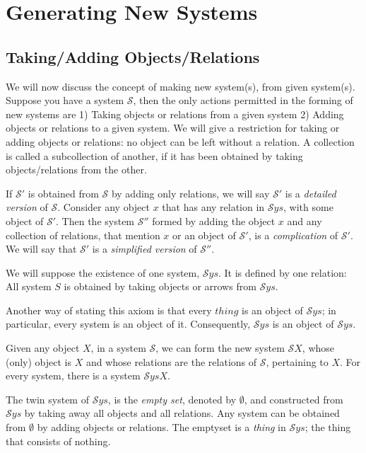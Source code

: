 \documentclass [12pt]{book}
\begin{document}
	\section{Generating New Systems}

		\subsection{Taking/Adding Objects/Relations}

We will now discuss the concept of making new system(s), from given system(s). Suppose you have a system $\mathcal{S}$, then the only actions permitted in the forming of new systems are 1) Taking objects or relations from a given system 2) Adding objects or relations to a given system. We will give a restriction for taking or adding objects or relations: no object can be left without a relation. A collection is called a subcollection of another, if it has been obtained by taking objects/relations from the other.

If $\mathcal{S}'$ is obtained from $\mathcal{S}$ by adding only relations, we will say $\mathcal{S}'$ is a \textit{detailed version} of $\mathcal{S}$. Consider any object $x$ that has any relation in $\mathcal{S}ys$, with some object of $\mathcal{S}'$. Then the system $\mathcal{S}''$ formed by adding the object $x$ and any collection of relations, that mention $x$ or an object of $\mathcal{S}'$, is a \textit{complication} of $\mathcal{S}'$. We will say that $\mathcal{S}'$ is a \textit{simplified version} of $\mathcal{S}''$.

\begin{axiom}We will suppose the existence of one system, $\mathcal{S}ys$. It is defined by one relation: All system $S$ is obtained by taking objects or arrows from $\mathcal{S}ys$.\end{axiom}


Another way of stating this axiom is that every $thing$ is an object of $\mathcal{S}ys$; in particular, every system is an object of it. Consequently, $\mathcal Sys$ is an object of $\mathcal Sys$.


\begin{axiom}Given any object $X$, in a system $\mathcal{S}$, we can form the new system $\mathcal{S}X$, whose (only) object is $X$ and whose relations are the relations of $\mathcal{S}$, pertaining to $X$. For every system, there is a system $\mathcal{S}ysX$.
\end{axiom}

The twin system of $\mathcal{S}ys$, is the \textit{empty set}, denoted by $\emptyset$, and constructed from $\mathcal{S}ys$ by taking away all objects and all relations. Any system can be obtained from $\emptyset$ by adding objects or relations. The emptyset is a \textit{thing} in $\mathcal Sys$; the thing that consists of nothing.
\end{document}
